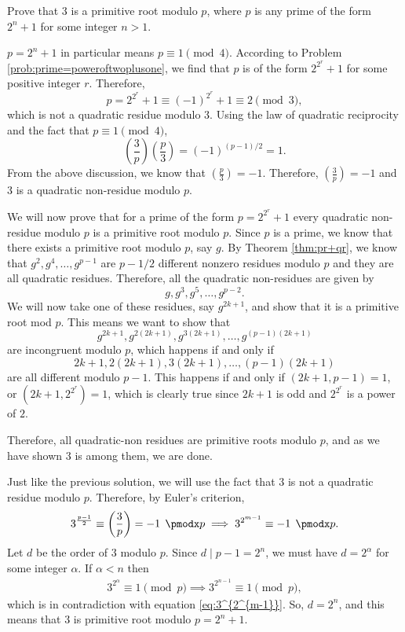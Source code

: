 \documentclass{subfile}
\begin{document}
	\begin{problem}
		Prove that $3$ is a primitive root modulo $p$, where $p$ is any prime of the form $2^n+1$ for some integer $n>1$.
	\end{problem}
	
	\begin{solution}[1]
		$p=2^n+1$ in particular means $p \equiv 1 \pmod{4}$.
		According to Problem \ref{prob:prime=poweroftwoplusone}, we find that $p$ is of the form $2^{2^r} + 1$ for some positive integer $r$. Therefore, $$p = 2^{2^{r}} +1 \equiv (-1)^{2^r} +1 \equiv 2 \pmod{3},$$ which is not a quadratic residue modulo $3$.
		Using the law of quadratic reciprocity and the fact that $p \equiv 1 \pmod{4}$, 
		\[\left(\dfrac{3}{p}\right) \left(\dfrac{p}{3}\right) = (-1)^{(p-1)/2} =1.\] From the above discussion, we know that $\left( \frac{p}{3} \right) = -1$. Therefore, $\left(\frac{3}{p}\right)=-1$ and $3$ is a quadratic non-residue modulo $p$.
		
		We will now prove that for a prime of the form $p=2^{2^{r}}+1$ every quadratic non-residue modulo $p$ is a primitive root modulo $p$. Since $p$ is a prime, we know that there exists a primitive root modulo $p$, say $g$. By Theorem \ref{thm:pr+qr}, we know that $g^2,g^4,\dots,g^{p-1}$ are ${p-1}/{2}$ different nonzero residues modulo $p$ and they are all quadratic residues. Therefore, all the quadratic non-residues are given by $$g,g^3,g^5,\dots,g^{p-2}.$$
		We will now take one of these residues, say $g^{2k+1}$, and show that it is a primitive root mod ${p}$. This means we want to show that $$g^{2k+1},g^{2(2k+1)},g^{3(2k+1)},\ldots,g^{(p-1)(2k+1)}$$ are incongruent modulo $p$, which  happens if and only if $$2k+1,2(2k+1),3(2k+1),\ldots,(p-1)(2k+1)$$ are all different modulo ${p-1}$. This happens if and only if $(2k+1,p-1)=1$, or $(2k+1,2^{2^r})=1$, which is clearly true since $2k+1$ is odd and $2^{2^{r}}$ is a power of $2$. 
		
		Therefore, all quadratic-non residues are primitive roots modulo $p$, and as we have shown $3$ is among them, we are done.
	\end{solution}
	
	\begin{solution}[2]
		Just like the previous solution, we will use the fact that $3$ is not a quadratic residue modulo $p$. Therefore, by Euler's criterion,
			\begin{align}\label{eq:3^{2^{m-1}}}
				3^{\frac{p-1}{2}} \equiv  \left( \frac{3}{p} \right) = -1 \pmod p \implies 3^{2^{m-1}} \equiv -1 \pmod p.
			\end{align}
		Let $d$ be the order of $3$ modulo $p$. Since $d\mid p-1=2^n$, we must have $d=2^{\alpha}$ for some integer $\alpha$. If $\alpha<n$ then
			\begin{align*}
				3^{2^{\alpha}}\equiv 1\pmod{p}\implies 3^{2^{n-1}}\equiv 1\pmod{p},
			\end{align*}
		which is in contradiction with equation \eqref{eq:3^{2^{m-1}}}. So, $d=2^n$, and this means that $3$ is primitive root modulo $p=2^n+1$.
	\end{solution}
	
\end{document}
